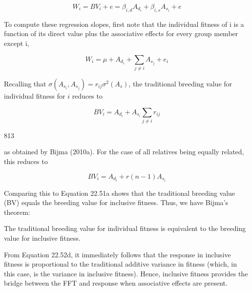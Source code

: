 \documentclass{article}
\begin{document}
\begin{equation}
W_{i}=BV_{i}+e=\beta_{i,d}A_{d_{i}}+\beta_{i,s}A_{s_{i}}+e
\tag{22.53a}
\label{eq:22_53a}
\end{equation}

To compute these regression slopes, first note that the individual fitness of i is a function of its direct value plus the associative effects for every group member except i,

\begin{equation}
W_{i}=\mu+A_{d_{i}}+\sum_{j\neq i}A_{s_{j}}+e_{i}
\end{equation}

Recalling that  $ \sigma(A_{s_i}, A_{s_j}) = r_{ij} \sigma^2(A_s) $, the traditional breeding value for individual fitness for  $ i $ reduces to

\begin{equation}
BV_{i}=A_{d_{i}}+A_{s_{i}}\sum_{j\neq i}r_{ij}
\tag{22.53b}
\label{eq:22_53b}
\end{equation}

813

as obtained by Bijma (2010a). For the case of all relatives being equally related, this reduces to

\begin{equation}
B V_{i}=A_{d_{i}}+r(n-1)A_{s_{i}}
\tag{22.53c}
\label{eq:22_53c}
\end{equation}

Comparing this to Equation 22.51a shows that the traditional breeding value (BV) equals the breeding value for inclusive fitness. Thus, we have Bijma's theorem:

The traditional breeding value for individual fitness is equivalent to the breeding value for inclusive fitness.

From Equation 22.52d, it immediately follows that the response in inclusive fitness is proportional to the traditional additive variance in fitness (which, in this case, is the variance in inclusive fitness). Hence, inclusive fitness provides the bridge between the FFT and response when associative effects are present.
\end{document}
